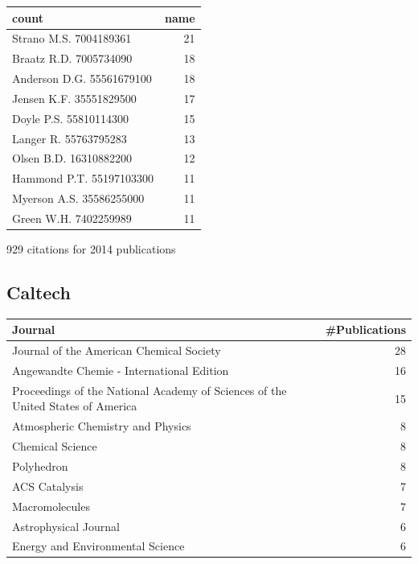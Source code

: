\documentclass[11pt]{article}
\begin{document}
\begin{center}
\begin{tabular}{lr}
count & name\\
\hline
Strano M.S. 7004189361 & 21\\
Braatz R.D. 7005734090 & 18\\
Anderson D.G. 55561679100 & 18\\
Jensen K.F. 35551829500 & 17\\
Doyle P.S. 55810114300 & 15\\
Langer R. 55763795283 & 13\\
Olsen B.D. 16310882200 & 12\\
Hammond P.T. 55197103300 & 11\\
Myerson A.S. 35586255000 & 11\\
Green W.H. 7402259989 & 11\\
\end{tabular}
\end{center}

929 citations for 2014 publications

\subsection{Caltech}
\label{sec-1-2}

\begin{center}
\begin{tabular}{lr}
Journal & \#Publications\\
\hline
Journal of the American Chemical Society & 28\\
Angewandte Chemie - International Edition & 16\\
Proceedings of the National Academy of Sciences of the United States of America & 15\\
Atmospheric Chemistry and Physics & 8\\
Chemical Science & 8\\
Polyhedron & 8\\
ACS Catalysis & 7\\
Macromolecules & 7\\
Astrophysical Journal & 6\\
Energy and Environmental Science & 6\\
\end{tabular}
\end{center}
\end{document}
